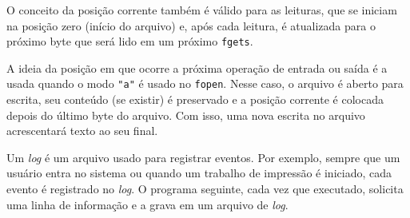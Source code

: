\documentclass[
  11pt,
  a4paper,
]{scrbook}
\newenvironment{Shaded}{\begin{snugshade}}{\end{snugshade}}
\newcommand{\KeywordTok}[1]{\textcolor[rgb]{0.13,0.29,0.53}{\textbf{#1}}}
\newcommand{\NormalTok}[1]{#1}
\begin{document}
\begin{Shaded}
\end{Shaded}

O conceito da posição corrente também é válido para as leituras, que se
iniciam na posição zero (início do arquivo) e, após cada leitura, é
atualizada para o próximo byte que será lido em um próximo
\texttt{fgets}.

A ideia da posição em que ocorre a próxima operação de entrada ou saída
é a usada quando o modo \texttt{"a"} é usado no \texttt{fopen}. Nesse
caso, o arquivo é aberto para escrita, seu conteúdo (se existir) é
preservado e a posição corrente é colocada depois do último byte do
arquivo. Com isso, uma nova escrita no arquivo acrescentará texto ao seu
final.

Um \emph{log} é um arquivo usado para registrar eventos. Por exemplo,
sempre que um usuário entra no sistema ou quando um trabalho de
impressão é iniciado, cada evento é registrado no \emph{log}. O programa
seguinte, cada vez que executado, solicita uma linha de informação e a
grava em um arquivo de \emph{log}.
\end{document}
